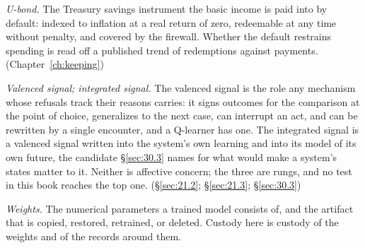 \emph{U-bond.} The Treasury savings instrument the basic income is paid into by default: indexed to inflation at a real return of zero, redeemable at any time without penalty, and covered by the firewall. Whether the default restrains spending is read off a published trend of redemptions against payments. (Chapter~\ref{ch:keeping})

\emph{Valenced signal; integrated signal.} The valenced signal is the role any mechanism whose refusals track their reasons carries: it signs outcomes for the comparison at the point of choice, generalizes to the next case, can interrupt an act, and can be rewritten by a single encounter, and a Q-learner has one. The integrated signal is a valenced signal written into the system's own learning and into its model of its own future, the candidate \S\ref{sec:30.3} names for what would make a system's states matter to it. Neither is affective concern; the three are rungs, and no test in this book reaches the top one. (\S\ref{sec:21.2}; \S\ref{sec:21.3}; \S\ref{sec:30.3})

\emph{Weights.} The numerical parameters a trained model consists of, and the artifact that is copied, restored, retrained, or deleted. Custody here is custody of the weights and of the records around them.
